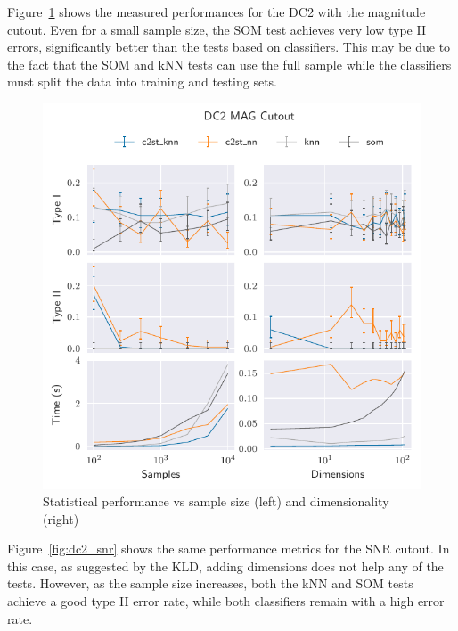 Figure~\ref{fig:dc2_mag} shows the measured performances for the DC2 with the magnitude
cutout. Even for a small sample size, the \gls{SOM}  test achieves very low type II errors, 
significantly better than the tests based on classifiers.
This may be due to the fact that the \gls{SOM} and kNN
tests can use the full sample while the classifiers must split the data into training and testing sets.


\begin{figure}[htpb]
    \centering
    \includegraphics{images/6_som/dc2_mag}
    \caption{Statistical performance vs sample size (left) and dimensionality (right)}
    \label{fig:dc2_mag}
\end{figure}

Figure~\ref{fig:dc2_snr} shows the same performance metrics for the SNR cutout. In this case,
as suggested by the \gls{KLD}, adding dimensions does not help any of the tests.
However, as the sample size increases, both the \gls{kNN} and \gls{SOM}  tests achieve a good type II error rate,
while both classifiers remain with a high error rate.

